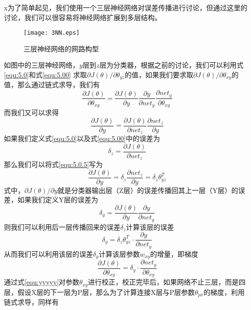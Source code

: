 x为了简单起见，我们使用一个三层神经网络对误差传播进行讨论，但通过这里的讨论，我们可以很容易将神经网络扩展到多层结构。
\begin{figure}[!htbp]
\centering
\texttt{[image: 3NN.eps]}
\caption{三层神经网络的网路构型}
\label{img:3NN}
\end{figure}
如图中的三层神经网络，$y$层到$z$层为分类器，根据之前的讨论，我们可以利用式\eqref{equ:5.0}和式\eqref{equ:5.00} 求取$\partial J(\theta)/\partial \theta_{yz}$的值，如果我们要求取$\partial J(\theta)/\partial \theta_{xy}$的值，那么通过链式求导，我们有
\begin{equation}
\frac{\partial J(\theta)}{\partial\theta_{xy}} = \frac{\partial J(\theta)}{\partial y} \frac{\partial y}{\partial net_y} \frac{\partial net_y}{\partial \theta_{xy}}\label{equ:xxxxx}
\end{equation}
而我们又可以求得
\begin{equation}
\frac{\partial J(\theta)}{\partial y} =  \frac{\partial J(\theta)}{\partial net_z} \frac{\partial net_z}{\partial y}\label{equ:5.0.5}
\end{equation}
如果我们定义式\eqref{equ:5.0}以及式\eqref{equ:5.00}中的误差为
\begin{equation}
\delta_z = \frac{\partial J(\theta)}{\partial net_z}
\end{equation}
那么我们可以将式\eqref{equ:5.0.5}写为
\begin{equation}
\frac{\partial J(\theta)}{\partial y}  =  \delta_z \frac{\partial net_z}{\partial y} = \delta_z \theta_{yz}^T
\end{equation}
式中，$\partial J(\theta) /\partial y$就是分类器输出层（Z层）的误差传播回其上一层（Y层）的误差，如果我们定义Y层的误差为
\begin{equation}
\delta_y = \frac{\partial J(\theta)}{\partial y} \frac{\partial y}{\partial net_y}
\end{equation}
则我们可以利用后一层传播回来的误差$\delta_z$计算该层的误差
\begin{equation}
\delta_y = \delta_z \theta_{yz}^T  \cdot \frac{\partial y}{\partial net_y}
\end{equation}
从而我们可以利用该层的误差$\delta_y$计算该层参数$w_{xy}$的增量，即梯度
\begin{equation}
\frac{\partial J(\theta)}{\partial\theta_{xy}} =\delta_y \cdot  \frac{\partial net_y}{\partial \theta_{xy}}\label{equ:yyyyy}
\end{equation}
通过式\eqref{equ:yyyyy}对参数$\theta_{xy}$进行校正，校正完毕后，如果网络不止三层，而是四层，假设X层的下一层为P层，那么为了计算连接X层与P层参数$\theta_{px}$的梯度，利用链式求导，同样有
